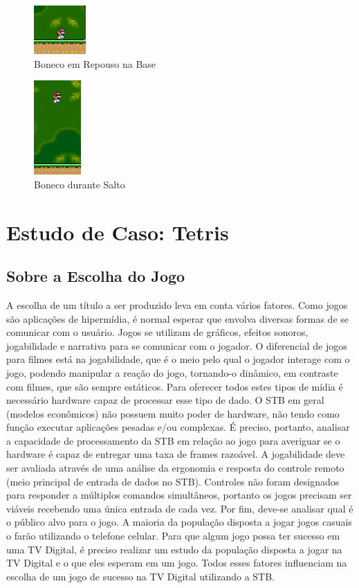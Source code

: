 \documentclass[
	12pt,				%
	openright,			%
	oneside,			%
	a4paper,			%
	brazil,				%
	]{abntex2}
\begin{document}
\begin{figure}
\centering
\includegraphics{img_ex_2.png}
\caption{Boneco em Repouso na Base}
\label{fig:imgEx2}
\end{figure}

\begin{figure}
\centering
\includegraphics{img_ex_3.png}
\caption{Boneco durante Salto}
\label{fig:imgEx3}
\end{figure}


\chapter{Estudo de Caso: Tetris}

\section{Sobre a Escolha do Jogo}

A escolha de um título a ser produzido leva em conta vários fatores. Como jogos são aplicações de hipermídia, é normal esperar que envolva diversas formas de se comunicar com o usuário. Jogos se utilizam de gráficos, efeitos sonoros, jogabilidade e narrativa para se comunicar com o jogador. O diferencial de jogos para filmes está na jogabilidade, que é o meio pelo qual o jogador interage com o jogo, podendo manipular a reação do jogo, tornando-o dinâmico, em contraste com filmes, que são sempre estáticos. Para oferecer todos estes tipos de mídia é necessário hardware capaz de processar esse tipo de dado. O STB em geral (modelos econômicos) não possuem muito poder de hardware, não tendo como função executar aplicações pesadas e/ou complexas. É preciso, portanto, analisar a capacidade de processamento da STB em relação ao jogo para averiguar se o hardware é capaz de entregar uma taxa de frames razoável. A jogabilidade deve ser avaliada através de uma análise da ergonomia e resposta do controle remoto (meio principal de entrada de dados no STB). Controles não foram designados para responder a múltiplos comandos simultâneos, portanto os jogos precisam ser viáveis recebendo uma única entrada de cada vez. Por fim, deve-se analisar qual é o público alvo para o jogo. A maioria da população disposta a jogar jogos casuais o farão utilizando o telefone celular. Para que algum jogo possa ter sucesso em uma TV Digital, é preciso realizar um estudo da população disposta a jogar na TV Digital e o que eles esperam em um jogo. Todos esses fatores influenciam na escolha de um jogo de sucesso na TV Digital utilizando a STB.
\end{document}
